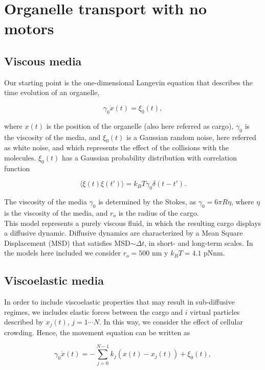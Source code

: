 \documentclass{article}
\begin{document}
\section{Organelle transport with no motors}
\subsection{Viscous media} 
Our starting point is the one-dimensional Langevin equation that describes the time evolution of an organelle, 


\begin{equation}\label{dif}
\gamma_0\dot{x}(t)=\xi_0(t),
\end{equation}

where $x(t)$ is the position of the organelle (also here referred as cargo), $\gamma_0$ is the viscosity of the media, and $\xi_0(t)$ is a Gaussian random noise, here referred as white noise, and which represents the effect of the collisions with the molecules. $\xi_0(t)$ has a Gaussian probability distribution with correlation function

\begin{equation}\label{fluc-disp}
\langle\xi(t) \xi(t')\rangle=k_BT\gamma_0\delta(t-t').
\end{equation}

The viscosity of the media $\gamma_0$ is determined by the Stokes, as $\gamma_0=6\pi R\eta$, where $\eta$ is the viscosity of the media, and $r_o$ is the radius of the cargo. \\

This model represents a purely viscous fluid, in which the resulting cargo displays a diffusive dynamic. Diffusive dynamics are characterized by a Mean Square Displacement (MSD) that satisfies MSD$\sim \Delta t$, in short- and long-term scales. In the models here included we consider $r_o=500$ nm y $k_BT=4.1$ pNnm.

\subsection{Viscoelastic media}

In order to include viscoelastic properties that may result in sub-diffusive regimes, we includes elastic forces between the cargo and $i$ virtual particles described by $x_j(t)$, $j=1\cdots N$. In this way, we consider the effect of cellular crowding. Hence, the movement equation can be written as

\begin{equation}\label{part-virt}
\gamma_0\dot{x}(t)=-\sum_{j=0}^{N-1}k_j(x(t)-x_j(t))+\xi_0(t),                                         \end{equation}
\end{document}

